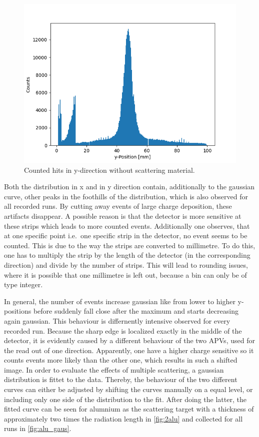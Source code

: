 \documentclass[sn-mathphys-num,iicol]{sn-jnl}
\theoremstyle{thmstyleone}
\theoremstyle{thmstyletwo}
\theoremstyle{thmstylethree}
\begin{document}
\begin{figure}
  \includegraphics[width=0.9\linewidth]{../src/elsa/finished_plots/unfiltered_noMaterial.png}
  \caption{Counted hits in y-direction without scattering material.}
  \label{fig:y_hist_notarget}
\end{figure}

Both the distribution in x and in y direction contain, additionally to the gaussian curve, other peaks in the foothills of the distribution, which is also observed for all recorded runs.
By cutting away events of large charge deposition, these artifacts disappear. 
A possible reason is that the detector is more sensitive at these strips which leads to more counted events.
Additionally one observes, that at one specific point i.e.\ one specific strip in the detector, no event seems to be counted.
This is due to the way the strips are converted to millimetre.
To do this, one has to multiply the strip by the length of the detector (in the corresponding direction) and divide by the number of strips.
This will lead to rounding issues, where it is possible that one millimetre is left out, because a bin can only be of type integer.

In general, the number of events increase gaussian like from lower to higher y-positions before suddenly fall close after the maximum and starts decreasing again gaussian. This behaviour is differnently intensive observed for every recorded run. Because the sharp edge is localized exactly in the middle of the detector, it is evidently caused by a different behaviour of the two APVs, used for the read out of one direction. Apparently, one have a higher charge sensitive so it counts events more likely than the other one, which results in such a shifted image. In order to evaluate the effects of multiple scattering, a gaussian distribution is fittet to the data. Thereby, the behaviour of the two different curves can either be adjusted by shifting the curves manually on a equal level, or including only one side of the distribution to the fit. After doing the latter, the fitted curve can be seen for alumnium as the scattering target with a thickness of approximately two times the radiation length in \autoref{fig:2alu} and collected for all runs in \autoref{fig:alu_gaus}.
\end{document}
